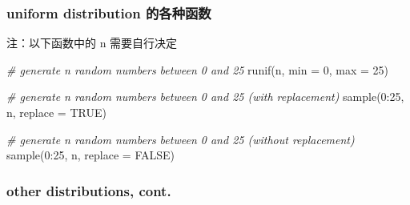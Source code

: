 \documentclass[
]{article}
\newenvironment{Shaded}{}{}
\newcommand{\AttributeTok}[1]{\textcolor[rgb]{0.49,0.56,0.16}{#1}}
\newcommand{\CommentTok}[1]{\textcolor[rgb]{0.38,0.63,0.69}{\textit{#1}}}
\newcommand{\ConstantTok}[1]{\textcolor[rgb]{0.53,0.00,0.00}{#1}}
\newcommand{\DecValTok}[1]{\textcolor[rgb]{0.25,0.63,0.44}{#1}}
\newcommand{\FunctionTok}[1]{\textcolor[rgb]{0.02,0.16,0.49}{#1}}
\newcommand{\NormalTok}[1]{#1}
\newcommand{\SpecialCharTok}[1]{\textcolor[rgb]{0.25,0.44,0.63}{#1}}
\begin{document}
\hypertarget{uniform-distribution-ux7684ux5404ux79cdux51fdux6570}{%
\subsubsection{uniform distribution
的各种函数}\label{uniform-distribution-ux7684ux5404ux79cdux51fdux6570}}

注：以下函数中的 n 需要自行决定

\begin{Shaded}
\begin{Highlighting}[]
\CommentTok{\# generate n random numbers between 0 and 25}
\FunctionTok{runif}\NormalTok{(n, }\AttributeTok{min =} \DecValTok{0}\NormalTok{, }\AttributeTok{max =} \DecValTok{25}\NormalTok{)       }

\CommentTok{\# generate n random numbers between 0 and 25 (with replacement)}
\FunctionTok{sample}\NormalTok{(}\DecValTok{0}\SpecialCharTok{:}\DecValTok{25}\NormalTok{, n, }\AttributeTok{replace =} \ConstantTok{TRUE}\NormalTok{)   }

\CommentTok{\# generate n random numbers between 0 and 25 (without replacement)}
\FunctionTok{sample}\NormalTok{(}\DecValTok{0}\SpecialCharTok{:}\DecValTok{25}\NormalTok{, n, }\AttributeTok{replace =} \ConstantTok{FALSE}\NormalTok{)  }
\end{Highlighting}
\end{Shaded}

\hypertarget{other-distributions-cont}{%
\subsubsection{other distributions,
cont.}\label{other-distributions-cont}}
\end{document}
